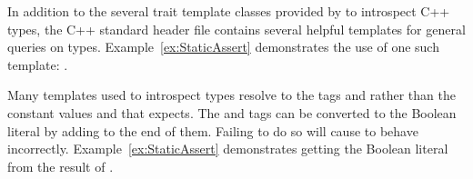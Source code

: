 
\begin{didyouknow}
  In addition to the several trait template classes provided by \VTKm to introspect C++ types, the C++ standard  header file contains several helpful templates for general queries on types.
  Example~\ref{ex:StaticAssert} demonstrates the use of one such template: .
\end{didyouknow}

\begin{commonerrors}
    
  Many templates used to introspect types resolve to the tags  and  rather than the constant values  and  that  expects.
  The  and  tags can be converted to the Boolean literal by adding  to the end of them.
  Failing to do so will cause  to behave incorrectly.
  Example~\ref{ex:StaticAssert} demonstrates getting the Boolean literal from the result of .
\end{commonerrors}



